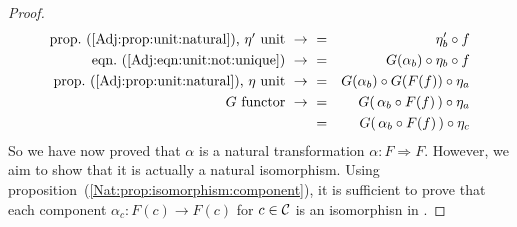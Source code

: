 \begin{proof}
\begin{eqnarray*}
            \mbox{prop.~(\ref{Adj:prop:unit:natural}), $\eta'$ unit}\ \to\ 
            &=&\eta'_{b}\circ f\\
            \mbox{eqn.~(\ref{Adj:eqn:unit:not:unique})}\ \to\ 
            &=&G(\alpha_{b})\circ\eta_{b}\circ f\\
            \mbox{prop.~(\ref{Adj:prop:unit:natural}), $\eta$ unit}\ \to\ 
            &=&G(\alpha_{b})\circ G(F(f))\circ\eta_{a}\\
            \mbox{$G$ functor}\ \to\ 
            &=&G(\,\alpha_{b}\circ F(f)\,)\circ\eta_{a}\\
            &=&G(\,\alpha_{b}\circ F(f)\,)\circ\eta_{c}\\
        \end{eqnarray*}
    So we have now proved that $\alpha$ is a natural transformation
    $\alpha:F\Rightarrow F$. However, we aim to show that it is actually
    a natural isomorphism. 
    Using proposition~(\ref{Nat:prop:isomorphism:component}), it is sufficient
    to prove that each component $\alpha_{c}:F(c)\to F(c)$ for $c\in\mbox{$\cal C$}$ is 
    an isomorphisn in \Dat.
\end{proof}
